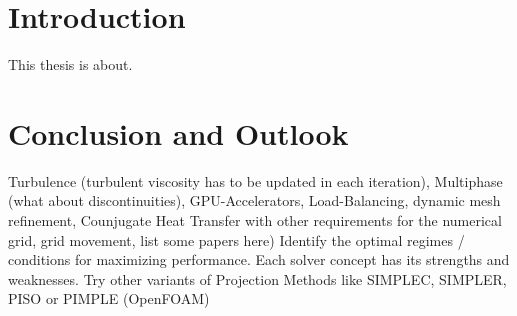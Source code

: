 \documentclass[article,type=msc,colorback,accentcolor=tud2a]{tudthesis}
\begin{document}
  \author{Fabian Gabel}
  \makethesistitle
  \tableofcontents
  \listoffigures
  \listoftables
  \listofalgorithms



  \section{Introduction}
  This thesis is about. 

  
  
  
  
  
  
  

  \section{Conclusion and Outlook}
  Turbulence (turbulent viscosity has to be updated in each iteration), Multiphase (what about discontinuities), GPU-Accelerators, Load-Balancing, dynamic mesh refinement, Counjugate Heat Transfer with other requirements for the numerical grid, grid movement, list some papers here)
    Identify the optimal regimes / conditions for maximizing performance. Each solver concept has its strengths and weaknesses.
    Try other variants of Projection Methods like SIMPLEC, SIMPLER, PISO or PIMPLE (OpenFOAM)

    \nocite{*}

\clearpage
{}
{}

\end{document}
